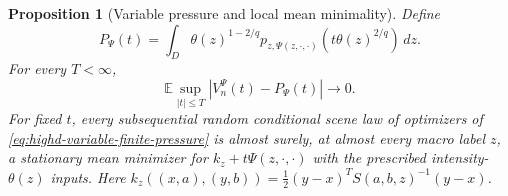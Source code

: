 \documentclass[11pt,reqno]{amsart}
\newtheorem{proposition}[theorem]{Proposition}
\theoremstyle{definition}
\theoremstyle{remark}
\numberwithin{equation}{section}
\newcommand{\E}{\mathbb E}
\begin{document}
\begin{proposition}[Variable pressure and local mean minimality]
\label{prop:highd-variable-pressure}
Define
\begin{equation}
\label{eq:highd-variable-pressure}
 P_\Psi(t)=\int_D\theta(z)^{1-2/q}
       p_{z,\Psi(z,\cdot,\cdot)}(t\theta(z)^{2/q})\,dz.
\end{equation}
For every \(T<\infty\),
\[
 \E\sup_{|t|\le T}|V_n^\Psi(t)-P_\Psi(t)|\longrightarrow0.
\]
For fixed \(t\), every subsequential random conditional scene law of
optimizers of \eqref{eq:highd-variable-finite-pressure} is almost surely,
at almost every macro label \(z\), a stationary mean minimizer for
\(k_z+t\Psi(z,\cdot,\cdot)\) with the prescribed intensity-\(\theta(z)\)
inputs. Here \(k_z((x,a),(y,b))=\tfrac12(y-x)^TS(a,b,z)^{-1}(y-x)\).
\end{proposition}
\end{document}
